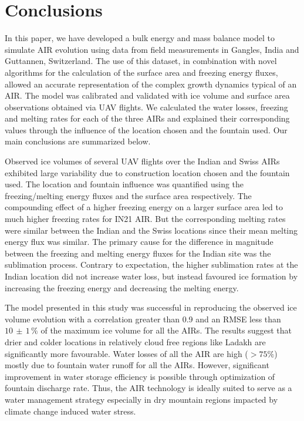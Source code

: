 \documentclass[utf8]{frontiersSCNS} %
\begin{document}
\section{Conclusions}

In this paper, we have developed a bulk energy and mass balance model to simulate AIR evolution using data from
field measurements in Gangles, India and Guttannen, Switzerland. The use of this dataset, in combination with novel
algorithms for the calculation of the surface area and freezing energy fluxes, allowed an accurate representation
of the complex growth dynamics typical of an AIR. The model was calibrated and validated with ice volume and
surface area observations obtained via UAV flights. We calculated the water losses, freezing and melting rates for
each of the three AIRs and explained their corresponding values through the influence of the location chosen and
the fountain used. Our main conclusions are summarized below.

Observed ice volumes of several UAV flights over the Indian and Swiss AIRs exhibited large variability due to
construction location chosen and the fountain used. The location and fountain influence was quantified using the
freezing/melting energy fluxes and the surface area respectively. The compounding effect of a higher freezing
energy on a larger surface area led to much higher freezing rates for IN21 AIR. But the corresponding melting rates
were similar between the Indian and the Swiss locations since their mean melting energy flux was similar. The
primary cause for the difference in magnitude between the freezing and melting energy fluxes for the Indian site
was the sublimation process.  Contrary to expectation, the higher sublimation rates at the Indian location did not
increase water loss, but instead favoured ice formation by increasing the freezing energy and decreasing the
melting energy.

The model presented in this study was successful in reproducing the observed ice volume evolution with a
correlation greater than 0.9 and an RMSE less than $10 \, \pm \, 1 \, \%$ of the maximum ice volume for all the
AIRs. The results suggest that drier and colder locations in relatively cloud free regions like Ladakh are
significantly more favourable. Water losses of all the AIR are high ($>75\%$) mostly due to fountain water runoff
for all the AIRs. However, significant improvement in water storage efficiency is possible through optimization of
fountain discharge rate. Thus, the AIR technology is ideally suited to serve as a water management strategy
especially in dry mountain regions impacted by climate change induced water stress.
\end{document}
